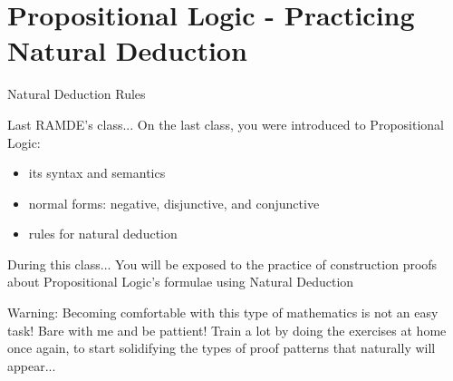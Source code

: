 \documentclass[aspectratio=169]{beamer}
\begin{document}
\frame[plain]{\titlepage}


\section{Propositional Logic - Practicing Natural Deduction}

\begin{slide}{Natural Deduction Rules}
\small

\begin{block}{Last RAMDE's class...}
  On the last class, you were introduced to Propositional Logic:
  \begin{itemize}
    \item its syntax and semantics
    \item normal forms: negative, disjunctive, and conjunctive
    \item rules for natural deduction
  \end{itemize}
\end{block}

\begin{block}{During this class...}
You will be exposed to the practice of construction proofs about Propositional Logic's formulae using Natural Deduction  
\end{block}


\begin{alert}{Warning:}
Becoming comfortable with this type of mathematics is not an easy task! Bare with me and be pattient! Train a lot by doing the exercises at home once again, to start solidifying the types of proof patterns that naturally will appear...
\end{alert}

\end{slide}
\end{document}
